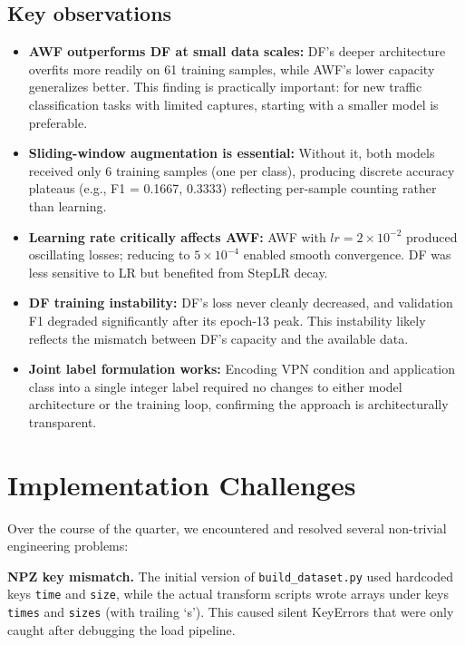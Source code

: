 \documentclass[letterpaper,twocolumn,10pt]{article}
\begin{document}
\subsection{Key observations}
\begin{itemize}[leftmargin=1.2em]
  \item \textbf{AWF outperforms DF at small data scales:} DF's deeper architecture overfits more readily on 61 training samples, while AWF's lower capacity generalizes better. This finding is practically important: for new traffic classification tasks with limited captures, starting with a smaller model is preferable.
  \item \textbf{Sliding-window augmentation is essential:} Without it, both models received only 6 training samples (one per class), producing discrete accuracy plateaus (e.g., F1 = 0.1667, 0.3333) reflecting per-sample counting rather than learning.
  \item \textbf{Learning rate critically affects AWF:} AWF with $lr = 2\times10^{-2}$ produced oscillating losses; reducing to $5\times10^{-4}$ enabled smooth convergence. DF was less sensitive to LR but benefited from StepLR decay.
  \item \textbf{DF training instability:} DF's loss never cleanly decreased, and validation F1 degraded significantly after its epoch-13 peak. This instability likely reflects the mismatch between DF's capacity and the available data.
  \item \textbf{Joint label formulation works:} Encoding VPN condition and application class into a single integer label required no changes to either model architecture or the training loop, confirming the approach is architecturally transparent.
\end{itemize}

\section{Implementation Challenges}

Over the course of the quarter, we encountered and resolved several non-trivial engineering problems:

\textbf{NPZ key mismatch.} The initial version of \texttt{build\_dataset.py} used hardcoded keys \texttt{time} and \texttt{size}, while the actual transform scripts wrote arrays under keys \texttt{times} and \texttt{sizes} (with trailing `s'). This caused silent KeyErrors that were only caught after debugging the load pipeline.
\end{document}
